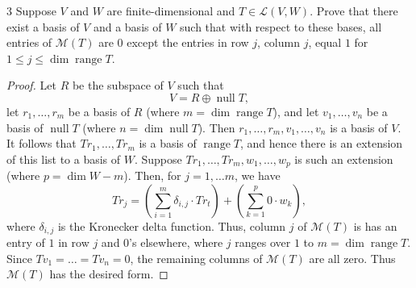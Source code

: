 \documentclass{extarticle}
\newenvironment{problem}[1]{\begin{prob*}{#1}{}}{\end{prob*}}
\newcommand{\mat}{\mathcal{M}}
\newcommand{\Hom}{\mathcal{L}}
\DeclareMathOperator{\Null}{null}
\DeclareMathOperator{\Range}{range}
\begin{document}
\begin{problem}{3}
Suppose $V$ and $W$ are finite-dimensional and $T\in\Hom(V,W)$.  Prove that there exist a basis of $V$ and a basis of $W$ such that with respect to these bases, all entries of $\mat(T)$ are $0$ except the entries in row $j$, column $j$, equal $1$ for $1\leq j\leq \dim\Range T$.  
\end{problem}
\begin{proof}
Let $R$ be the subspace of $V$ such that 
\begin{equation*}
V = R\oplus \Null T,
\end{equation*}
let $r_1,\dots, r_m$ be a basis of $R$ (where $m =\dim\Range T$), and let $v_1,\dots, v_n$ be a basis of $\Null T$ (where $n = \dim\Null T$).  Then $r_1,\dots, r_m, v_1,\dots,v_n$ is a basis of $V$.  It follows that $Tr_1,\dots, Tr_m$ is a basis of $\Range T$, and hence there is an extension of this list to a basis of $W$.  Suppose $Tr_1,\dots, Tr_m, w_1,\dots, w_p$ is such an extension (where $p = \dim W - m$).  Then, for $j = 1,\dots m$, we have
\begin{equation*}
Tr_j = \left(\sum_{i = 1}^m\delta_{i,j}\cdot Tr_t\right) + \left(\sum_{k = 1}^p 0\cdot w_k\right),
\end{equation*}
where $\delta_{i,j}$ is the Kronecker delta function.  Thus, column $j$ of $\mat(T)$ is has an entry of $1$ in row $j$ and $0$'s elsewhere, where $j$ ranges over $1$ to $m = \dim\Range T$.  Since $Tv_1 = \dots = Tv_n = 0$, the remaining columns of $\mat(T)$ are all zero.  Thus $\mat(T)$ has the desired form.
\end{proof}
\end{document}
